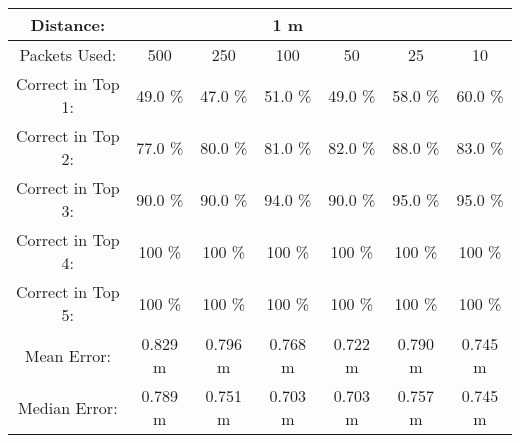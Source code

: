 \begin{tabular}{| c || c | c | c | c | c | c |}
\hline
Distance: &  &  & 1 m &  &  & \\
\hline
Packets Used: & 500 & 250 & 100 & 50 & 25 & 10 \\
\hline
\hline
Correct in Top 1: & 49.0 \% & 47.0 \% & 51.0 \% & 49.0 \% & 58.0 \% & 60.0 \% \\
\hline
Correct in Top 2: & 77.0 \% & 80.0 \% & 81.0 \% & 82.0 \% & 88.0 \% & 83.0 \% \\
\hline
Correct in Top 3: & 90.0 \% & 90.0 \% & 94.0 \% & 90.0 \% & 95.0 \% & 95.0 \% \\
\hline
Correct in Top 4: & 100 \% & 100 \% & 100 \% & 100 \% & 100 \% & 100 \% \\
\hline
Correct in Top 5: & 100 \% & 100 \% & 100 \% & 100 \% & 100 \% & 100 \% \\
\hline
\hline
Mean Error: & 0.829 m & 0.796 m & 0.768 m & 0.722 m & 0.790 m & 0.745 m \\
\hline
Median Error: & 0.789 m & 0.751 m & 0.703 m & 0.703 m & 0.757 m & 0.745 m \\
\hline
\end{tabular}